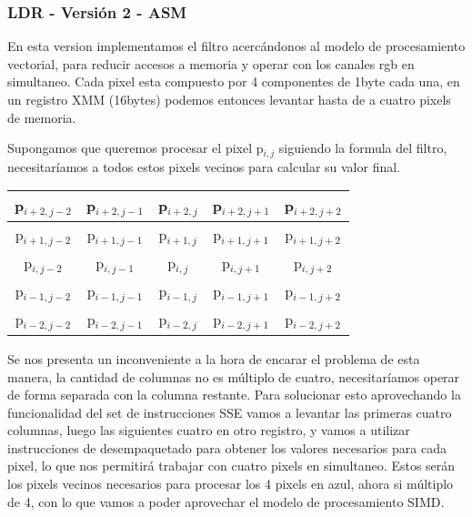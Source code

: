\subsubsection{LDR - Versión 2 - ASM}
En esta version implementamos el filtro acercándonos al modelo de procesamiento vectorial, para reducir accesos a memoria y operar con los canales rgb en simultaneo. Cada pixel esta compuesto por 4 componentes de 1byte cada una, en un registro XMM (16bytes) podemos entonces levantar hasta de a cuatro pixels de memoria.

Supongamos que queremos procesar el pixel p$_{i,j}$ siguiendo la formula del filtro, necesitaríamos a todos estos pixels vecinos para calcular su valor final.

\begin{table}[!h]
	\centering
	\begin{tabular}{| c | c | c | c | c |}
		\hline
		p$_{i+2,j-2}$ & p$_{i+2,j-1}$ & p$_{i+2,j}$ & p$_{i+2,j+1}$ & p$_{i+2,j+2}$
		\\ \hline
		p$_{i+1,j-2}$ & p$_{i+1,j-1}$ & p$_{i+1,j}$ & p$_{i+1,j+1}$ & p$_{i+1,j+2}$
		\\ \hline
		p$_{i,j-2}$ & p$_{i,j-1}$ & \cellcolor{blue!25}p$_{i,j}$ & p$_{i,j+1}$ & p$_{i,j+2}$
		\\ \hline
		p$_{i-1,j-2}$ & p$_{i-1,j-1}$ & p$_{i-1,j}$ & p$_{i-1,j+1}$ & p$_{i-1,j+2}$
		\\ \hline
		p$_{i-2,j-2}$ & p$_{i-2,j-1}$ & p$_{i-2,j}$ & p$_{i-2,j+1}$ & p$_{i-2,j+2}$
		\\ \hline
	\end{tabular}
\end{table}

Se nos presenta un inconveniente a la hora de encarar el problema de esta manera, la cantidad de columnas no es múltiplo de cuatro, necesitaríamos operar de forma separada con la columna restante. Para solucionar esto aprovechando la funcionalidad del set de instrucciones SSE vamos a levantar las primeras cuatro columnas, luego las siguientes cuatro en otro registro, y vamos a utilizar instrucciones de desempaquetado para obtener los valores necesarios para cada pixel, lo que nos permitirá trabajar con cuatro pixels en simultaneo. Estos serán los pixels vecinos necesarios para procesar los 4 pixels en azul, ahora si múltiplo de 4, con lo que vamos a poder aprovechar el modelo de procesamiento SIMD.

